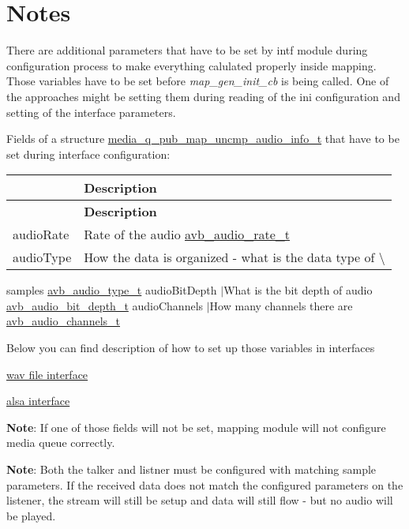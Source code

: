 \section*{Notes}

There are additional parameters that have to be set by intf module during configuration process to make everything calulated properly inside mapping. Those variables have to be set before {\itshape map\+\_\+gen\+\_\+init\+\_\+cb} is being called. One of the approaches might be setting them during reading of the ini configuration and setting of the interface parameters.

Fields of a structure \hyperlink{structmedia__q__pub__map__uncmp__audio__info__t}{media\+\_\+q\+\_\+pub\+\_\+map\+\_\+uncmp\+\_\+audio\+\_\+info\+\_\+t} that have to be set during interface configuration\+: \tabulinesep=1mm
\begin{longtabu} spread 0pt [c]{*2{|X[-1]}|}
\hline
{}&{\bf Description  }\\
\endfirsthead
\hline
\endfoot
\hline
{}&{\bf Description  }\\
\endhead
audio\+Rate &Rate of the audio \hyperlink{openavb__audio__pub_8h_a6070f1cfbb6824de6f0b2524cd306903}{avb\+\_\+audio\+\_\+rate\+\_\+t} \\
audio\+Type &How the data is organized -\/ what is the data type of \textbackslash{} \\
\end{longtabu}
samples \hyperlink{openavb__audio__pub_8h_a680efa0db2b29a63c5a0e8f11975682f}{avb\+\_\+audio\+\_\+type\+\_\+t} audio\+Bit\+Depth $\vert$\+What is the bit depth of audio \hyperlink{openavb__audio__pub_8h_ae64ee32f6ac9a6b2cf607f46ee4160bd}{avb\+\_\+audio\+\_\+bit\+\_\+depth\+\_\+t} audio\+Channels $\vert$\+How many channels there are \hyperlink{openavb__audio__pub_8h_a8cc6b9a1352da050ead620139f49acc4}{avb\+\_\+audio\+\_\+channels\+\_\+t}

Below you can find description of how to set up those variables in interfaces
\begin{DoxyItemize}
\item \hyperlink{wav_file_intf}{wav file interface}
\item \hyperlink{alsa_intf}{alsa interface}
\end{DoxyItemize}

{\bfseries Note}\+: If one of those fields will not be set, mapping module will not configure media queue correctly.

{\bfseries Note}\+: Both the talker and listner must be configured with matching sample parameters. If the received data does not match the configured parameters on the listener, the stream will still be setup and data will still flow -\/ but no audio will be played. 